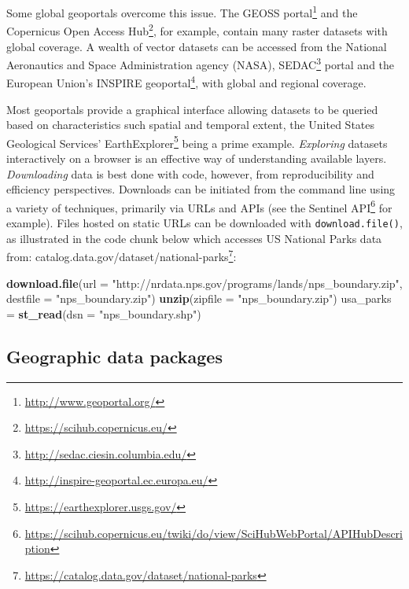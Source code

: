 \documentclass[]{krantz}
\newenvironment{Shaded}{\begin{snugshade}}{\end{snugshade}}
\newcommand{\DataTypeTok}[1]{\textcolor[rgb]{0.27,0.27,0.27}{#1}}
\newcommand{\KeywordTok}[1]{\textcolor[rgb]{0.27,0.27,0.27}{\textbf{#1}}}
\newcommand{\NormalTok}[1]{#1}
\newcommand{\StringTok}[1]{\textcolor[rgb]{0.5,0.5,0.5}{#1}}
\let\rmarkdownfootnote\footnote%
\def\footnote{\protect\rmarkdownfootnote}
\renewcommand{\href}[2]{#2\footnote{\url{#1}}}
\begin{document}
Some global geoportals overcome this issue.
The \href{http://www.geoportal.org/}{GEOSS portal} and the \href{https://scihub.copernicus.eu/}{Copernicus Open Access Hub}, for example, contain many raster datasets with global coverage.
A wealth of vector datasets can be accessed from the National Aeronautics and Space Administration agency (NASA), \href{http://sedac.ciesin.columbia.edu/}{SEDAC} portal and the European Union's \href{http://inspire-geoportal.ec.europa.eu/}{INSPIRE geoportal}, with global and regional coverage.

Most geoportals provide a graphical interface allowing datasets to be queried based on characteristics such spatial and temporal extent, the United States Geological Services' \href{https://earthexplorer.usgs.gov/}{EarthExplorer} being a prime example.
\emph{Exploring} datasets interactively on a browser is an effective way of understanding available layers.
\emph{Downloading} data is best done with code, however, from reproducibility and efficiency perspectives.
Downloads can be initiated from the command line using a variety of techniques, primarily via URLs and APIs (see the \href{https://scihub.copernicus.eu/twiki/do/view/SciHubWebPortal/APIHubDescription}{Sentinel API} for example).
Files hosted on static URLs can be downloaded with \texttt{download.file()}, as illustrated in the code chunk below which accesses US National Parks data from: \href{https://catalog.data.gov/dataset/national-parks}{catalog.data.gov/dataset/national-parks}:

\begin{Shaded}
\begin{Highlighting}[]
\KeywordTok{download.file}\NormalTok{(}\DataTypeTok{url =} \StringTok{"http://nrdata.nps.gov/programs/lands/nps_boundary.zip"}\NormalTok{,}
              \DataTypeTok{destfile =} \StringTok{"nps_boundary.zip"}\NormalTok{)}
\KeywordTok{unzip}\NormalTok{(}\DataTypeTok{zipfile =} \StringTok{"nps_boundary.zip"}\NormalTok{)}
\NormalTok{usa_parks =}\StringTok{ }\KeywordTok{st_read}\NormalTok{(}\DataTypeTok{dsn =} \StringTok{"nps_boundary.shp"}\NormalTok{)}
\end{Highlighting}
\end{Shaded}

\hypertarget{geographic-data-packages}{%
\subsection{Geographic data packages}\label{geographic-data-packages}}
\end{document}
